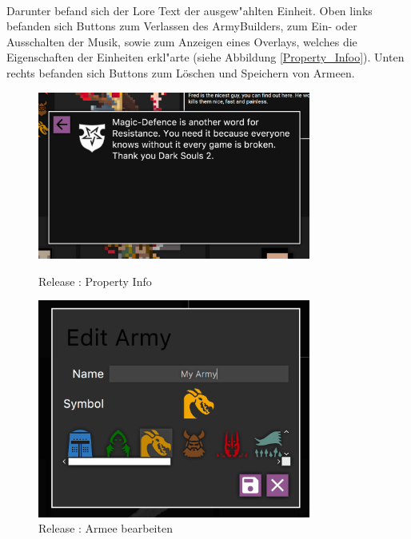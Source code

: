 \documentclass[12pt, titlepage]{scrartcl}
\newcommand{\RN}[1]{%
	\textup{\uppercase\expandafter{\romannumeral#1}}%
}
\begin{document}
			    \ \\ Darunter befand sich der Lore Text der ausgew"ahlten Einheit. Oben links befanden sich Buttons zum Verlassen des ArmyBuilders, zum Ein- oder Ausschalten der Musik, sowie zum Anzeigen eines Overlays, welches die Eigenschaften der Einheiten erkl"arte (siehe Abbildung \ref{Property_Infoo}). Unten rechts befanden sich Buttons zum L\"oschen und Speichern von Armeen. \\
			    \begin{figure}[H]
                    \centering
                    \begin{minipage}{0.5\textwidth}
                        \centering
                        \includegraphics[width=0.8\textwidth]{images/old_state/army_manager/PropertyInfo.png}
                        \caption{Release \RN{2}: Property Info}
                        \label{Property_Infoo}
                    \end{minipage}%
                    \begin{minipage}{0.5\textwidth}
                        \centering
                        \includegraphics[width=0.8\textwidth]{images/old_state/army_manager/EditArmy.png}
                        \caption{Release \RN{2}: Armee bearbeiten}
                        \label{Edit_Army}
                    \end{minipage}
                \end{figure}
\end{document}
